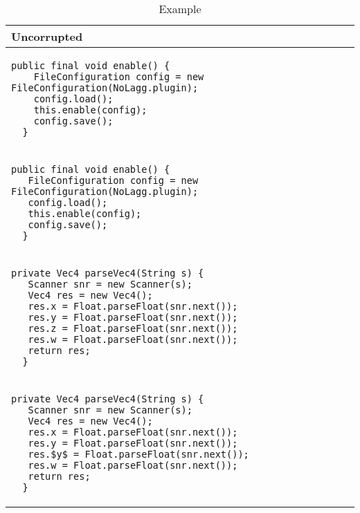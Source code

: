 \begin{table}[p]
\begin{tabular}{ | m{11cm} | }
  \hline
  Uncorrupted \\
  \hline
  {\begin{lstlisting}[style=table]
  public final void enable() {
    FileConfiguration config = new FileConfiguration(NoLagg.plugin);
    config.load();
    this.enable(config);
    config.save();
  }
  \end{lstlisting}} \\
  {\begin{lstlisting}[style=table]
  public final void enable() {
   FileConfiguration config = new FileConfiguration(NoLagg.plugin);
   config.load();
   this.enable(config);
   config.save();
  }
  \end{lstlisting}} \\
  \hline
  \hline
  {\begin{lstlisting}[style=table]
  private Vec4 parseVec4(String s) {
   Scanner snr = new Scanner(s);
   Vec4 res = new Vec4();
   res.x = Float.parseFloat(snr.next());
   res.y = Float.parseFloat(snr.next());
   res.z = Float.parseFloat(snr.next());
   res.w = Float.parseFloat(snr.next());
   return res;
  }
  \end{lstlisting}} \\
  {\begin{lstlisting}[style=table]
  private Vec4 parseVec4(String s) {
   Scanner snr = new Scanner(s);
   Vec4 res = new Vec4();
   res.x = Float.parseFloat(snr.next());
   res.y = Float.parseFloat(snr.next());
   res.$y$ = Float.parseFloat(snr.next());
   res.w = Float.parseFloat(snr.next());
   return res;
  }
  \end{lstlisting}} \\
  \hline
\end{tabular}
\caption{Example}
\label{uncorrupted_showcase_table}
\end{table}


